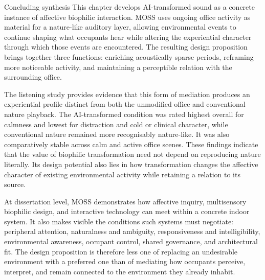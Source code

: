 
\clearpage

\clearpage

\begin{chapterclosing}{Concluding synthesis}
This chapter develops AI-transformed sound as a concrete instance of affective biophilic interaction. MOSS uses ongoing office activity as material for a nature-like auditory layer, allowing environmental events to continue shaping what occupants hear while altering the experiential character through which those events are encountered. The resulting design proposition brings together three functions: enriching acoustically sparse periods, reframing more noticeable activity, and maintaining a perceptible relation with the surrounding office.

The listening study provides evidence that this form of mediation produces an experiential profile distinct from both the unmodified office and conventional nature playback. The AI-transformed condition was rated highest overall for calmness and lowest for distraction and cold or clinical character, while conventional nature remained more recognisably nature-like. It was also comparatively stable across calm and active office scenes. These findings indicate that the value of biophilic transformation need not depend on reproducing nature literally. Its design potential also lies in how transformation changes the affective character of existing environmental activity while retaining a relation to its source.

At dissertation level, MOSS demonstrates how affective inquiry, multisensory biophilic design, and interactive technology can meet within a concrete indoor system. It also makes visible the conditions such systems must negotiate: peripheral attention, naturalness and ambiguity, responsiveness and intelligibility, environmental awareness, occupant control, shared governance, and architectural fit. The design proposition is therefore less one of replacing an undesirable environment with a preferred one than of mediating how occupants perceive, interpret, and remain connected to the environment they already inhabit.

\end{chapterclosing}